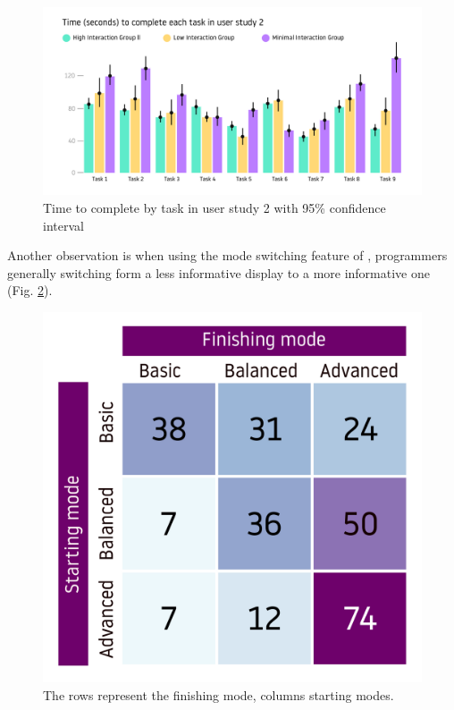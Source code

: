 \begin{figure}[h]
    \centering
    \includegraphics[width=\linewidth]{images/user-study-2.pdf}
    \caption{Time to complete by task in user study 2 with 95\% confidence interval}
    \label{fig:r4-analysis}
\end{figure}




Another observation is when using the mode switching feature of \chameleon{}, programmers generally switching form a less informative display to a more informative one (Fig. \ref{fig:r4-mode-switching}). 

\begin{figure}[h]
    \centering
    \includegraphics[width=\linewidth]{images/mode-switching.pdf}
    \caption{
        The rows represent the finishing mode, columns starting modes.
    }
    \label{fig:r4-mode-switching}
\end{figure}


